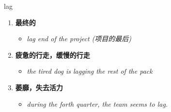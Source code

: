 
\begin{frame}
{\huge lag}
\begin{center}
\begin{enumerate}\Large
  \item \textbf{最终的}
  \begin{itemize}
    \item \em{\Large{lag end of the project (项目的最后)}}
  \end{itemize}
  \item \textbf{疲惫的行走，缓慢的行走}
  \begin{itemize}
    \item \em{\Large{the tired dog is lagging the rest of the pack}}
  \end{itemize}
  \item \textbf{萎靡，失去活力}
  \begin{itemize}
    \item \em{\Large{during the forth quarter, the team seems to lag.}}
  \end{itemize}
\end{enumerate}
\end{center}
\end{frame}
